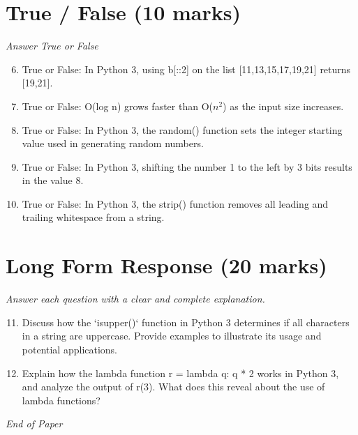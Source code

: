 \documentclass[12pt]{article}
\begin{document}
\section*{True / False (10 marks)}
\textit{Answer True or False}
\begin{enumerate}[label=\arabic*.]
\setcounter{enumi}{5}
\item True or False: In Python 3, using b[::2] on the list [11,13,15,17,19,21] returns [19,21].
\item True or False: O(log n) grows faster than O($n^2$) as the input size increases.
\item True or False: In Python 3, the random() function sets the integer starting value used in generating random numbers.
\item True or False: In Python 3, shifting the number 1 to the left by 3 bits results in the value 8.
\item True or False: In Python 3, the strip() function removes all leading and trailing whitespace from a string.
\end{enumerate}

\section*{Long Form Response (20 marks)}
\textit{Answer each question with a clear and complete explanation.}
\begin{enumerate}[label=\arabic*.]
\setcounter{enumi}{10}
\item Discuss how the `isupper()` function in Python 3 determines if all characters in a string are uppercase. Provide examples to illustrate its usage and potential applications.
\item Explain how the lambda function r = lambda q: q * 2 works in Python 3, and analyze the output of r(3). What does this reveal about the use of lambda functions?
\end{enumerate}

\vfill
\noindent\textit{End of Paper}
\end{document}
